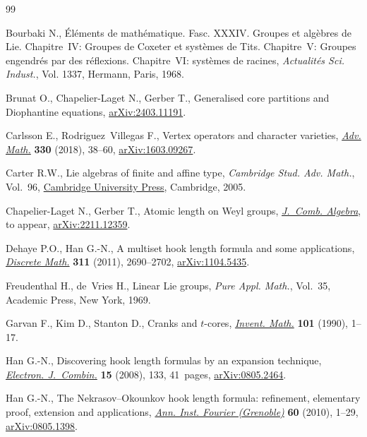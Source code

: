 \begin{thebibliography}{99}
\footnotesize\itemsep=0pt

Bourbaki N., \'El\'ements de math\'ematique. {F}asc. {XXXIV}. {G}roupes et
 alg\`ebres de {L}ie. {C}hapitre~{IV}: {G}roupes de {C}oxeter et syst\`emes de
 {T}its. {C}hapitre~{V}: {G}roupes engendr\'es par des r\'eflexions.
 {C}hapitre~{VI}: syst\`emes de racines, \textit{Actualit\'es Sci. Indust.},
 Vol. 1337, Hermann, Paris, 1968.

Brunat O., Chapelier-Laget N., Gerber T., Generalised core partitions and
 {D}iophantine equations, \href{https://arxiv.org/abs/2403.11191}{arXiv:2403.11191}.

Carlsson E., Rodriguez~Villegas F., Vertex operators and character varieties,
 \href{https://doi.org/10.1016/j.aim.2017.12.024}{\textit{Adv. Math.}} \textbf{330} (2018), 38--60, \href{https://arxiv.org/abs/1603.09267}{arXiv:1603.09267}.

Carter R.W., Lie algebras of finite and affine type, \textit{Cambridge Stud.
 Adv. Math.}, Vol.~96, \href{https://doi.org/10.1017/CBO9780511614910}{Cambridge University Press}, Cambridge, 2005.

Chapelier-Laget N., Gerber T., Atomic length on {W}eyl groups, \href{https://doi.org/10.4171/JCA/104}{\textit{J.~Comb.
 Algebra}}, {t}o appear, \href{https://arxiv.org/abs/2211.12359}{arXiv:2211.12359}.

Dehaye P.O., Han G.-N., A multiset hook length formula and some applications,
 \href{https://doi.org/10.1016/j.disc.2011.08.018}{\textit{Discrete Math.}} \textbf{311} (2011), 2690--2702, \href{https://arxiv.org/abs/1104.5435}{arXiv:1104.5435}.

Freudenthal H., de~Vries H., Linear {L}ie groups, \textit{Pure Appl. Math.},
 Vol.~35, Academic Press, New York, 1969.

Garvan F., Kim D., Stanton D., Cranks and {$t$}-cores, \href{https://doi.org/10.1007/BF01231493}{\textit{Invent. Math.}}
 \textbf{101} (1990), 1--17.

Han G.-N., Discovering hook length formulas by an expansion technique,
 \href{https://doi.org/10.37236/857}{\textit{Electron. J.~Combin.}} \textbf{15} (2008), 133, 41~pages,
 \href{https://arxiv.org/abs/0805.2464}{arXiv:0805.2464}.

Han G.-N., The {N}ekrasov--{O}kounkov hook length formula: refinement,
 elementary proof, extension and applications, \href{https://doi.org/10.5802/aif.2515}{\textit{Ann. Inst. Fourier
 (Grenoble)}} \textbf{60} (2010), 1--29, \href{https://arxiv.org/abs/0805.1398}{arXiv:0805.1398}.


\end{thebibliography}
